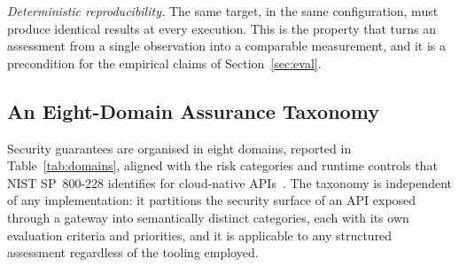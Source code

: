 \emph{Deterministic reproducibility.} The same target, in the same configuration, must produce identical results at every execution.
This is the property that turns an assessment from a single observation into a comparable measurement, and it is a precondition for the empirical claims of Section~\ref{sec:eval}.

\subsection{An Eight-Domain Assurance Taxonomy}
\label{sec:taxonomy}

Security guarantees are organised in eight domains, reported in Table~\ref{tab:domains}, aligned with the risk categories and runtime controls that NIST SP~800-228 identifies for cloud-native APIs~\cite{chandramouliGuidelinesAPIProtection2026}.
The taxonomy is independent of any implementation: it partitions the security surface of an API exposed through a gateway into semantically distinct categories, each with its own evaluation criteria and priorities, and it is applicable to any structured assessment regardless of the tooling employed.

